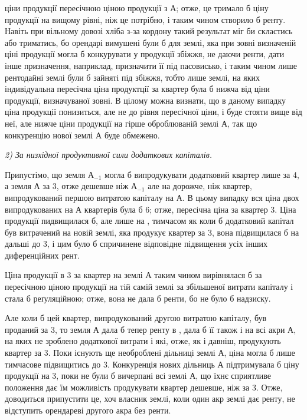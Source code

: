 \parcont{}  %
ціни продукції пересічною ціною продукції з $А$; отже, це тримало б ціну продукції
на вищому рівні, ніж це потрібно, і таким чином створило б ренту.
Навіть при вільному довозі хліба з-за кордону такий результат міг би скластись
або триматись, бо орендарі вимушені були б для землі, яка при зовні
визначеній ціні продукції могла б конкурувати у продукції збіжжя, не даючи
ренти, дати інше призначення, наприклад, призначити її під пасовисько, і таким
чином лише рентодайні землі були б зайняті під збіжжя, тобто лише землі,
на яких індивідуальна пересічна ціна продуктції за квартер була б нижча від
ціни продукції, визначуваної зовні. В цілому можна визнати, що в даному випадку
ціна продукції понизиться, але не до рівня пересічної ціни, і буде стояти
вище від неї, але нижче ціни продукції на гірше оброблюваній землі $А$, так
що конкуренцію нової землі $А$ буде обмежено.

\emph{2) За низхідної продуктивної сили додаткових капіталів.}

Припустімо, що земля $А_{-1}$ могла б випродукувати додатковий квартер
лише за 4, а земля $А$ за 3, отже дешевше ніж $А_{-1}$ але на  дорожче, ніж квартер, випродукований першою витратою капіталу на
$А$. В цьому випадку вся ціна двох випродукованих на $А$ квартерів була б \deq{}
6; отже, пересічна ціна за квартер \deq{} 3. Ціна продукції
пидвищилася б, але лише на , тимчасом як коли б додатковий
капітал був витрачений на новій землі, яка продукує квартер за 3, вона підвищилася б на дальші  до 3, і цим
було б спричинене відповідне підвищення усіх інших диференційних рент.

Ціна продукції в 3 за квартер на землі $А$ таким чином
вирівнялася б за пересічною ціною продукції на тій самій землі за збільшеної
витрати капіталу і стала б реґуляційною; отже, вона не дала б ренти, бо не
було б надзиску.

Але коли б цей квартер, випродукований другою витратою капіталу, був проданий
за 3, то земля $А$ дала б тепер ренту в ,
дала б її також і на всі акри $А$, на яких не зроблено додаткової витрати і
які, отже, як і давніш, продукують квартер за 3. Поки існують ще
необроблені дільниці землі $А$, ціна могла б лише тимчасове підвищитись до
3. Конкуренція нових дільниць $А$ підтримувала б ціну продукції
на 3, поки не були б вичерпані всі землі $А$, що їхнє сприятливе положення
дає їм можливість продукувати квартер дешевше, ніж за 3.
Отже, доводиться припустити це, хоч власник землі, коли один акр землі дає ренту,
не відступить орендареві другого акра без ренти.

